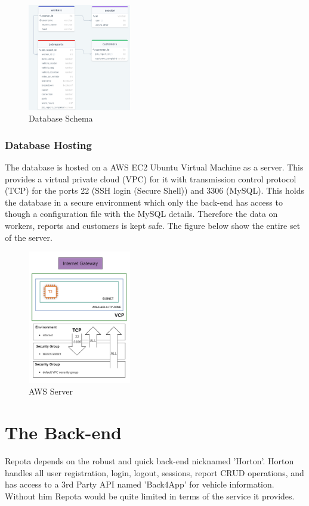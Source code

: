 \begin{figure}[H]
    \caption{Database Schema}
    \label{image:db}
    \centering
    \includegraphics[width=0.4\textwidth]{images/database/database.png}
\end{figure}

\subsubsection{Database Hosting}
The database is hosted on a AWS EC2 Ubuntu Virtual Machine as a server. This provides a virtual private cloud (VPC) for it with transmission control protocol (TCP) for the ports 22 (SSH login (Secure Shell)) and 3306 (MySQL). This holds the database in a secure environment which only the back-end has access to though a configuration file with the MySQL details. Therefore the data on workers, reports and customers is kept safe. The figure below show the entire set of the server.

\begin{figure}[H]
    \caption{AWS Server}
    \label{image:db_aws}
    \centering
    \includegraphics[width=0.4\textwidth]{images/aws/aws_linux.png}
\end{figure}

\section{The Back-end}
Repota depends on the robust and quick back-end nicknamed 'Horton'. 
Horton handles all user registration, login, logout, sessions, report CRUD operations, and has access to a 3rd Party API named 'Back4App' for vehicle information. Without him Repota would be quite limited in terms of the service it provides. 

